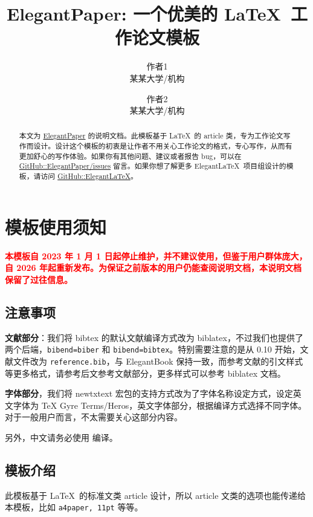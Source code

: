 \documentclass[lang=cn,a4paper,newtx]{elegantpaper}
\title{ElegantPaper: 一个优美的 \LaTeX\ 工作论文模板}
\author{作者1 \\ 某某大学/机构 \and 作者2 \\ 某某大学/机构}
\institute{\href{https://github.com/ElegantLaTeX}{Elegant\LaTeX\ 项目组}}
\date{\zhdate{2026/2/27}}
\begin{document}
\maketitle

\begin{abstract}
本文为 \href{https://github.com/ElegantLaTeX/ElegantPaper/}{ElegantPaper} 的说明文档。此模板基于 \LaTeX\ 的 article 类，专为工作论文写作而设计。设计这个模板的初衷是让作者不用关心工作论文的格式，专心写作，从而有更加舒心的写作体验。如果你有其他问题、建议或者报告 bug，可以在 \href{https://github.com/ElegantLaTeX/ElegantPaper/issues}{GitHub::ElegantPaper/issues} 留言。如果你想了解更多 Elegant\LaTeX\ 项目组设计的模板，请访问 \href{https://github.com/ElegantLaTeX/}{GitHub::ElegantLaTeX}。
\end{abstract}

\section{模板使用须知}

\textcolor{red}{\bfseries 本模板自 2023 年 1 月 1 日起停止维护，并不建议使用，但鉴于用户群体庞大，自 2026 年起重新发布。为保证之前版本的用户仍能查阅说明文档，本说明文档保留了过往信息。}

\subsection{注意事项}
\textbf{文献部分}：我们将 bibtex 的默认文献编译方式改为 biblatex，不过我们也提供了两个后端，\lstinline{bibend=biber} 和 \lstinline{bibend=bibtex}。特别需要注意的是从 0.10 开始，文献文件改为 \lstinline{reference.bib}，与 ElegantBook 保持一致，而参考文献的引文样式等更多格式，请参考后文参考文献部分，更多样式可以参考 biblatex 文档。 

\textbf{字体部分}，我们将 newtxtext 宏包的支持方式改为了字体名称设定方式，设定英文字体为 TeX Gyre Terms/Heros，英文字体部分，根据编译方式选择不同字体。对于一般用户而言，不太需要关心这部分内容。

另外，中文请务必使用  编译。

\subsection{模板介绍}

此模板基于 \LaTeX\ 的标准文类 article 设计，所以 article 文类的选项也能传递给本模板，比如 \lstinline{a4paper, 11pt} 等等。
\end{document}
